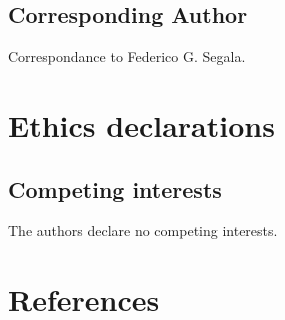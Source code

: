 \documentclass[
]{article}
\begin{document}
\hypertarget{corresponding-author}{%
\subsection{Corresponding Author}\label{corresponding-author}}

Correspondance to Federico G. Segala.

\hypertarget{ethics-declarations}{%
\section{Ethics declarations}\label{ethics-declarations}}

\hypertarget{competing-interests}{%
\subsection{Competing interests}\label{competing-interests}}

The authors declare no competing interests.

\hypertarget{references}{%
\section*{References}\label{references}}
\end{document}
